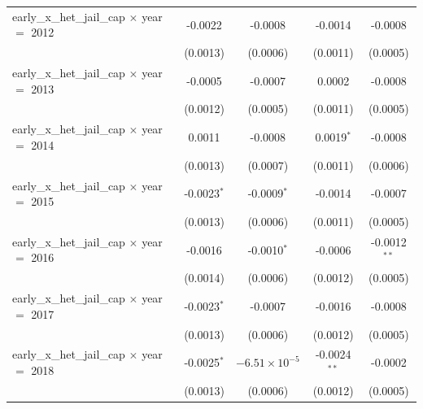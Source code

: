 \begin{tabular}{lcccc}
   early\_x\_het\_jail\_cap $\times$ year $=$ 2012      & -0.0022               & -0.0008                   & -0.0014                & -0.0008\\   
                                                        & (0.0013)              & (0.0006)                  & (0.0011)               & (0.0005)\\   
   early\_x\_het\_jail\_cap $\times$ year $=$ 2013      & -0.0005               & -0.0007                   & 0.0002                 & -0.0008\\   
                                                        & (0.0012)              & (0.0005)                  & (0.0011)               & (0.0005)\\   
   early\_x\_het\_jail\_cap $\times$ year $=$ 2014      & 0.0011                & -0.0008                   & 0.0019$^{*}$           & -0.0008\\   
                                                        & (0.0013)              & (0.0007)                  & (0.0011)               & (0.0006)\\   
   early\_x\_het\_jail\_cap $\times$ year $=$ 2015      & -0.0023$^{*}$         & -0.0009$^{*}$             & -0.0014                & -0.0007\\   
                                                        & (0.0013)              & (0.0006)                  & (0.0011)               & (0.0005)\\   
   early\_x\_het\_jail\_cap $\times$ year $=$ 2016      & -0.0016               & -0.0010$^{*}$             & -0.0006                & -0.0012$^{**}$\\   
                                                        & (0.0014)              & (0.0006)                  & (0.0012)               & (0.0005)\\   
   early\_x\_het\_jail\_cap $\times$ year $=$ 2017      & -0.0023$^{*}$         & -0.0007                   & -0.0016                & -0.0008\\   
                                                        & (0.0013)              & (0.0006)                  & (0.0012)               & (0.0005)\\   
   early\_x\_het\_jail\_cap $\times$ year $=$ 2018      & -0.0025$^{*}$         & $-6.51\times 10^{-5}$     & -0.0024$^{**}$         & -0.0002\\   
                                                        & (0.0013)              & (0.0006)                  & (0.0012)               & (0.0005)\\   

\end{tabular}
